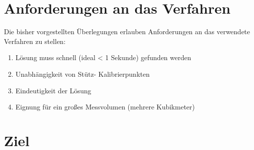 \section{Anforderungen an das Verfahren}
Die bisher vorgestellten Überlegungen erlauben Anforderungen an das verwendete Verfahren zu stellen:
\begin{enumerate}
\item Lösung muss schnell (ideal < 1 Sekunde) gefunden werden
\item Unabhängigkeit von Stütz- Kalibrierpunkten
\item Eindeutigkeit der Lösung
\item Eignung für ein großes Messvolumen (mehrere Kubikmeter)
%
\end{enumerate}
%
\section{Ziel}
%

